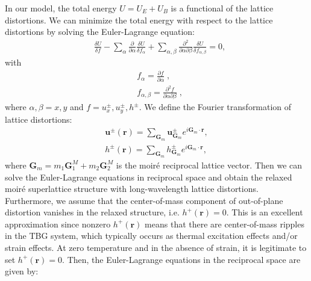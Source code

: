 \documentclass[aps,prx,10pt,twocolumn,superscriptaddress]{revtex4}
\begin{document}
In our model, the total energy $U\!=\!U_{E}+U_{B}$ is a functional of the lattice distortions. We can minimize the total energy with respect to the lattice distortions by solving the Euler-Lagrange equation:
\begin{equation}
\begin{split}
&\frac{\delta U}{\delta f}-\sum_{\alpha}\frac{\partial}{\partial \alpha}\frac{\delta U}{\delta f_{\alpha}}+\sum_{\alpha,\beta}\frac{\partial^{2}}{\partial \alpha\partial \beta}\frac{\delta U}{\delta f_{\alpha,\beta}}=0,
\end{split}
\end{equation}
with 
\begin{align}
&f_{\alpha}=\frac{\partial f}{\partial \alpha}\;,\\ 
&f_{\alpha,\beta}=\frac{\partial^{2} f}{\partial \alpha\partial\beta}\;,
\end{align}
where $\alpha,\beta\!=\!x,y$ and $f\!=\!u^{\pm}_{x},u^{\pm}_{y},h^{\pm}$. We define the Fourier transformation of lattice distortions:
\begin{equation}\label{eq:fts}
\begin{split}
\textbf{u}^{\pm}(\textbf{r})=\sum_{\textbf{G}_{m}}\textbf{u}^{\pm}_{\textbf{G}_{m}}e^{i\textbf{G}_{m}\cdot\textbf{r}},\\
h^{\pm}(\textbf{r})=\sum_{\textbf{G}_{m}}h^{\pm}_{\textbf{G}_{m}}e^{i\textbf{G}_{m}\cdot\textbf{r}},
\end{split}
\end{equation} 
where $\textbf{G}_{m}\!=\!m_{1}\textbf{G}^{M}_{1}+m_{2}\textbf{G}^{M}_{2}$ is the moir\'e reciprocal lattice vector. Then we can solve the Euler-Lagrange equations in reciprocal space and obtain the relaxed moir\'e superlattice structure with long-wavelength lattice distortions. Furthermore, 
we assume that the center-of-mass component of out-of-plane distortion vanishes in the relaxed structure, i.e. $h^{+}(\textbf{r})=0$. This is an excellent approximation since nonzero $h^{+}(\textbf{r})$ means that there are center-of-mass ripples in the TBG system, which typically occurs as  thermal excitation effects and/or strain effects. At zero temperature and in the absence of strain, it is legitimate to set $h^{+}(\textbf{r})=0$.
Then, the Euler-Lagrange equations in the reciprocal space are given by: %
\end{document}
